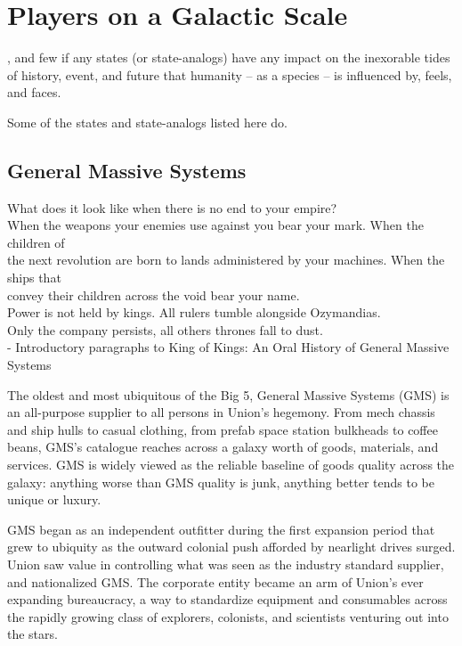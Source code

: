 \section{Players on a Galactic Scale}

, and few if any states (or state-analogs) have any
impact on the inexorable tides of history, event, and future that humanity -- as a species -- is
influenced by, feels, and faces.

Some of the states and state-analogs listed here do.

\subsection{General Massive Systems}

\begin{loreQuote}
    What does it look like when there is no end to your empire?\\

    When the weapons your enemies use against you bear your mark. When the children of\\
    the next revolution are born to lands administered by your machines. When the ships that\\
    convey their children across the void bear your name.\\

    Power is not held by kings. All rulers tumble alongside Ozymandias.\\

    Only the company persists, all others thrones fall to dust.\\

    \quad - Introductory paragraphs to \textnormal{King of Kings: An Oral History of General Massive Systems}
\end{loreQuote}

The oldest and most ubiquitous of the Big 5, General Massive Systems (GMS) is an all-purpose
supplier to all persons in Union’s hegemony. From mech chassis and ship hulls to casual clothing,
from prefab space station bulkheads to coffee beans, GMS’s catalogue reaches across a galaxy
worth of goods, materials, and services. GMS is widely viewed as the reliable baseline of goods
quality across the galaxy: anything worse than GMS quality is junk, anything better tends to be
unique or luxury.

GMS began as an independent outfitter during the first expansion period that grew to ubiquity as
the outward colonial push afforded by nearlight drives surged. Union saw value in controlling what
was seen as the industry standard supplier, and nationalized GMS. The corporate entity became
an arm of Union’s ever expanding bureaucracy, a way to standardize equipment and
consumables across the rapidly growing class of explorers, colonists, and scientists venturing out
into the stars.

